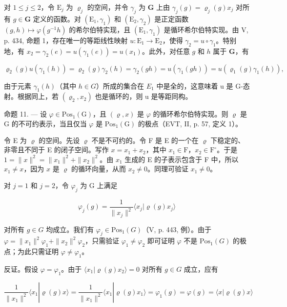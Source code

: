 对 \(1 \leqslant j \leqslant 2\)，令 \(\mathrm{E}_j\) 为 \(\varrho_j\) 的空间，并令 \(\gamma_j\) 为 \(\mathbf{G}\) 上由 \(\gamma_j(g) = \varrho_j(g)x_j\) 对所有 \(g \in \mathbf{G}\) 定义的函数。对 \((\mathrm{E}_1, \gamma_1)\) 和 \((\mathrm{E}_2, \gamma_2)\) 是正定函数 \((g, h) \mapsto \varphi(g^{-1}h)\) 的希尔伯特实现，且 \((\mathrm{E}_1, \gamma_1)\) 是循环希尔伯特实现。由 V, p. 434, 命题 1，存在唯一的等距线性映射 \(u: \mathrm{E}_1 \to \mathrm{E}_2\)，使得 \(\gamma_2 = u \circ \gamma_1\)。特别地，有 \(x_2 = \gamma_2(e) = u(\gamma_1(e)) = u(x_1)\)。此外，对任意 \(g\) 和 \(h\) 属于 \(\mathbf{G}\)，有

\[
\varrho_ {2} (g) u \left(\gamma_ {1} (h)\right) = \varrho_ {2} (g) \gamma_ {2} (h) = \gamma_ {2} (g h) = u \left(\gamma_ {1} (g h)\right) = u \left(\varrho_ {1} (g) \gamma_ {1} (h)\right),
\]

由于元素 \(\gamma_{1}(h)\)（其中 \(h \in G\)）所成的集合在 \(E_{1}\) 中是全的，这意味着 u 是 G-态射。根据同上，若 \((\varrho_{2}, x_{2})\) 也是循环的，则 u 是等距同构。

命题 11. — 设 \(\varphi \in \mathrm{Pos}_{1}(\mathrm{G})\)，且 \((\varrho, x)\) 是 \(\varphi\) 的循环希尔伯特实现。则 \(\varrho\) 是 G 的不可约表示，当且仅当 \(\varphi\) 是 \(\mathrm{Pos}_{1}(\mathrm{G})\) 的极点（EVT, II, p. 57, 定义 1）。

令 E 为 \(\varrho\) 的空间。先设 \(\varrho\) 不是不可约的。令 F 是 E 的一个在 \(\varrho\) 下稳定的、非零且不同于 E 的闭子空间。写作 \(x = x_1 + x_2\)，其中 \(x_1 \in \mathrm{F}\)，\(x_2 \in \mathrm{F}^\circ\)。于是 \(1 = \|x\|^2 = \|x_1\|^2 + \|x_2\|^2\)。由 \(x_1\) 生成的 E 的子表示包含于 F 中，所以 \(x_1 \neq x\)，因为 \(x\) 是 \(\varrho\) 的循环向量，从而 \(x_2 \neq 0\)。同理可验证 \(x_1 \neq 0\)。

对 \(j = 1\) 和 \(j = 2\)，令 \(\varphi_j\) 为 G 上满足

\[
\varphi_ {j} (g) = \frac {1}{\| x _ {j} \| ^ {2}} \langle x _ {j} | \varrho (g) x _ {j} \rangle
\]

对所有 \(g \in G\) 均成立。我们有 \(\varphi_{j} \in \mathrm{Pos}_{1}(G)\)（V, p. 443, 例）。由于 \(\varphi = \|x_{1}\|^{2}\varphi_{1} + \|x_{2}\|^{2}\varphi_{2}\)，只需验证 \(\varphi_{1} \neq \varphi_{2}\) 即可证明 \(\varphi\) 不是 \(\mathrm{Pos}_{1}(G)\) 的极点；为此只需证明 \(\varphi \neq \varphi_{1}\)。

反证。假设 \(\varphi = \varphi_1\)。由于 \(\langle x_1 | \varrho(g)x_2 \rangle = 0\) 对所有 \(g \in G\) 成立，应有

\[
\frac {1}{\| x _ {1} \| ^ {2}} \langle x _ {1} | \varrho (g) x \rangle = \frac {1}{\| x _ {1} \| ^ {2}} \langle x _ {1} | \varrho (g) x _ {1} \rangle = \varphi_ {1} (g) = \varphi (g) = \langle x | \varrho (g) x \rangle
\]

